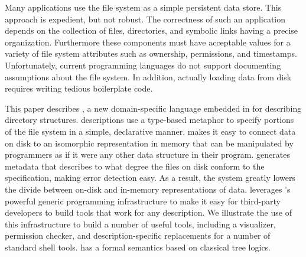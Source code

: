 Many applications use the file system as a simple persistent data
store.  This approach is expedient, but not robust.  
The correctness of such an application depends on the
collection of files, directories, and symbolic links having a
precise organization. Furthermore these components must have
acceptable values for a variety of file system attributes 
such as ownership, permissions, and timestamps. Unfortunately, current
programming languages do not support documenting assumptions about the
file system. In 
addition, actually loading data from disk requires writing tedious
boilerplate code.

This paper describes \forest{}, a new domain-specific language
embedded in \haskell{} for describing directory structures. \forest{}
descriptions use a type-based metaphor to specify portions of the file
system in a simple, declarative manner.  \forest{} makes it easy to
connect data on disk to an isomorphic representation in memory that
can be manipulated by programmers as if it were any other data
structure in their program.  \forest{} generates metadata that
describes to what degree the files on disk conform to the
specification, making error detection easy. As a result, the system greatly lowers
the divide between on-disk and in-memory representations of
data. \forest{} leverages \haskell{}'s powerful generic programming
infrastructure to make it easy for third-party developers to build
tools that work for any \forest{} description.  We illustrate the use
of this infrastructure to build a number of useful tools, including a
visualizer, permission checker, and description-specific replacements for a
number of standard shell tools. \forest{} has a formal semantics based
on classical tree logics.

